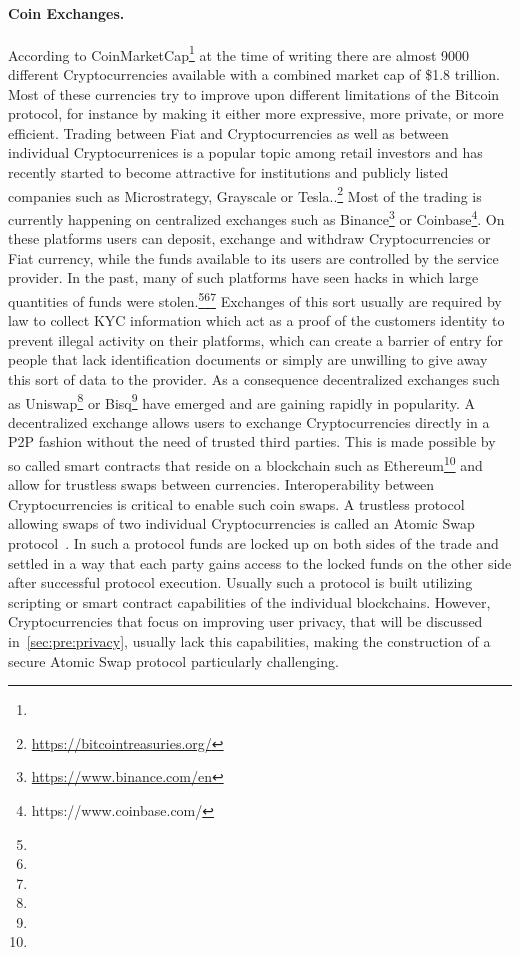 \paragraph{Coin Exchanges.} According to CoinMarketCap\footnote{\urlcoinmkt} at the time of writing there are almost 9000 different Cryptocurrencies available with a combined market cap of \$1.8 trillion.
Most of these currencies try to improve upon different limitations of the Bitcoin protocol, for instance by making it either more expressive, more private, or more efficient.
Trading between Fiat and Cryptocurrencies as well as between individual Cryptocurrenices is a popular topic among retail investors and has recently started to become attractive for institutions and publicly listed companies such as Microstrategy, Grayscale or Tesla..\footnote{\url{https://bitcointreasuries.org/}}
Most of the trading is currently happening on centralized exchanges such as Binance\footnote{\url{https://www.binance.com/en}} or Coinbase\footnote{https://www.coinbase.com/}.
On these platforms users can deposit, exchange and withdraw Cryptocurrencies or Fiat currency, while the funds available to its users are controlled by the service provider.
In the past, many of such platforms have seen hacks in which large quantities of funds were stolen.\footnote{\urlmtgox}\footnote{\urlbitgrail}\footnote{\urlquadriga}
Exchanges of this sort usually are required by law to collect KYC information which act as a proof of the customers identity to prevent illegal activity on their platforms, which can create a barrier of entry for people that lack identification documents or simply are unwilling to give away this sort of data to the provider.
As a consequence decentralized exchanges such as Uniswap\footnote{\urluniswp} or Bisq\footnote{\urlbisq} have emerged and are gaining rapidly in popularity.
A decentralized exchange allows users to exchange Cryptocurrencies directly in a P2P fashion without the need of trusted third parties.
This is made possible by so called smart contracts that reside on a blockchain such as Ethereum\footnote{\urlethereum} and allow for trustless swaps between currencies.
Interoperability between Cryptocurrencies is critical to enable such coin swaps.
A trustless protocol allowing swaps of two individual Cryptocurrencies is called an Atomic Swap protocol~\cite{herlihy2018atomic}.
In such a protocol funds are locked up on both sides of the trade and settled in a way that each party gains access to the locked funds on the other side after successful protocol execution.
Usually such a protocol is built utilizing scripting or smart contract capabilities of the individual blockchains.
However, Cryptocurrencies that focus on improving user privacy, that will be discussed in~\cref{sec:pre:privacy}, usually lack this capabilities, making the construction of a secure Atomic Swap protocol particularly challenging.

